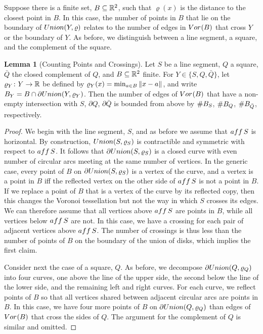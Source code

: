 \documentclass[a4paper]{article}
\newcommand {\mm}[1]   {\ifmmode{#1}\else{\mbox{\(#1\)}}\fi}
\newcommand{\Rspace}        {\mm{{\mathbb R}}}
\newcommand{\Voronoi}[2]    {\mm{{\rm Vor}_{#1}{({#2})}}}
\newcommand{\Union}[2]      {\mm{\rm Union}{({#1},{#2})}}
\newcommand{\card}[1]       {\mm{{\#}{#1}}}
\newcommand{\affine}[1]     {\mm{\rm aff\,}{#1}}
\newcommand{\Edist}[2]      {\mm{\|{#1}-{#2}\|}}
\theoremstyle{definition}
\numberwithin{theorem}{section}
\newtheorem{lemma}[theorem]{Lemma}
\numberwithin{equation}{section}
\begin{document}
Suppose there is a finite set, $B \subseteq \Rspace^2$, such that $\varrho (x)$ is the distance to the closest point in $B$.
In this case, the number of points in $B$ that lie on the boundary of $\Union{Y}{\varrho}$ relates to the number of edges in $\Voronoi{}{B}$ that cross $Y$ or the boundary of $Y$.
As before, we distinguish between a line segment, a square, and the complement of the square.
\begin{lemma}[Counting Points and Crossings]
  \label{lem:counting_points_and_crossings}
  Let $S$ be a line segment, $Q$ a square, $\bar{Q}$ the closed complement of $Q$, and $B \subseteq \Rspace^2$ finite.
  For $Y \in \{ S, Q, \bar{Q} \}$, let $\varrho_Y \colon Y \to \Rspace$ be defined by $\varrho_Y (x) = \min_{a \in B} \Edist{x}{a}$, and write $B_Y = B \cap \partial \Union{Y}{\varrho_Y}$.
  Then the number of edges of $\Voronoi{}{B}$ that have a non-empty intersection with $S$, $\partial Q$, $\partial \bar{Q}$ is bounded from above by $\card{B_S}$, $\card{B_Q}$, $\card{B_{\bar{Q}}}$, respectively.
\end{lemma}

\begin{proof}
  We begin with the line segment, $S$, and as before we assume that $\affine{S}$ is horizontal.
  By construction, $\Union{S}{\varrho_S}$ is contractible and symmetric with respect to $\affine{S}$.
  It follows that $\partial \Union{S}{\varrho_S}$ is a closed curve with even number of circular arcs meeting at the same number of vertices.
  In the generic case, every point of $B$ on $\partial \Union{S}{\varrho_S}$ is a vertex of the curve, and a vertex is a point in $B$ iff the reflected vertex on the other side of $\affine{S}$ is not a point in $B$.
  If we replace a point of $B$ that is a vertex of the curve by its reflected copy, then this changes the Voronoi tessellation but not the way in which $S$ crosses its edges.
  We can therefore assume that all vertices above $\affine{S}$ are points in $B$, while all vertices below $\affine{S}$ are not.
  In this case, we have a crossing for each pair of adjacent vertices above $\affine{S}$.
  The number of crossings is thus less than the number of points of $B$ on the boundary of the union of disks, which implies the first claim.
  
  Consider next the case of a square, $Q$.
  As before, we decompose $\partial \Union{Q}{\varrho_Q}$ into four curves, one above the line of the upper side, the second below the line of the lower side, and the remaining left and right curves.
  For each curve, we reflect points of $B$ so that all vertices shared between adjacent circular arcs are points in $B$.
  In this case, we have four more points of $B$ on $\partial \Union{Q}{\varrho_Q}$ than edges of $\Voronoi{}{B}$ that cross the sides of $Q$.
  The argument for the complement of $Q$ is similar and omitted.
\end{proof}
\end{document}
